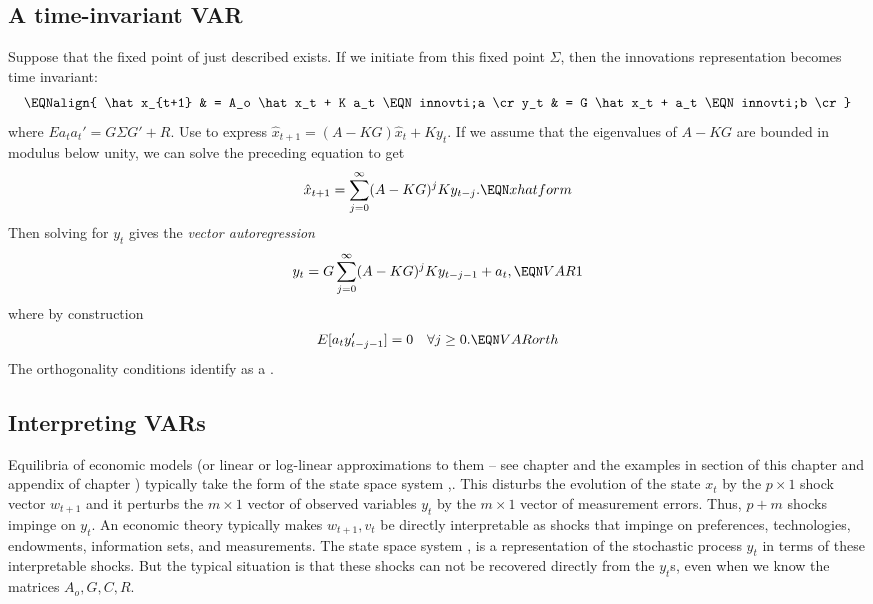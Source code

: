 \subsection{A time-invariant VAR}
Suppose that  the fixed point of  just  described exists. If we initiate  from this fixed point $\Sigma$, then the  innovations representation
becomes time invariant:
$$\EQNalign{ \hat x_{t+1} & = A_o \hat x_t + K a_t \EQN innovti;a \cr
             y_t & = G \hat x_t + a_t \EQN innovti;b \cr} $$
where $E a_t a_t' = G \Sigma G' + R$.  Use  to express
$ \hat x_{t+1} = (A -KG) \hat x_t + K y_t$.  If we assume that
the eigenvalues of $A-KG$ are bounded in modulus below unity, we can
solve the preceding equation to get
$$\hat x_{t+1} = \sum_{j=0}^\infty  (A-KG)^j K y_{t-j}. \EQN xhatform $$
Then solving  for $y_t$ gives
the {\it vector autoregression\/}
$$ y_t = G \sum_{j=0}^\infty (A-KG)^j K y_{t-j-1} + a_t ,\EQN VAR1 $$
where by construction
$$ E[a_t y_{t-j-1}' ]= 0 \quad \forall j \geq 0 .\EQN VARorth $$
The orthogonality conditions  identify  as a .

\subsection{Interpreting VARs}

Equilibria of economic models (or linear or log-linear approximations to them -- see chapter  and the examples
in section  of this chapter and appendix  of chapter )  typically
take the form of the state space system ,.  This    disturbs the evolution of the  state $x_t$
by the $p\times 1 $ shock vector $w_{t+1}$  and it perturbs the $ m \times 1$ vector of observed variables $y_t$
by the $ m \times 1$ vector of measurement errors. Thus,  $p + m$ shocks  impinge on $y_t$.
An economic theory typically makes  $w_{t+1}, v_t$ be directly interpretable as shocks that impinge on preferences, technologies,
endowments, information sets, and measurements.
The state space system  , is a representation of the stochastic process  $y_t$ in terms of these interpretable shocks.
But the typical situation is that these shocks can  not be recovered directly from the $y_t$s, even when we know the matrices $A_o, G, C, R$.

